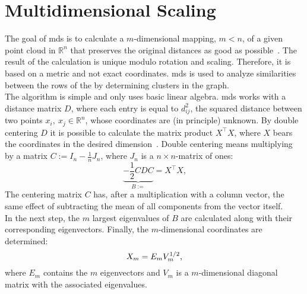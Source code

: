 \section{Multidimensional Scaling}
The goal of \gls{mds} is to calculate a $ m $-dimensional mapping, $ m < n $, of a given point cloud in $ \mathbb{R}^n $ that preserves the original distances as good as possible~\cite{HaTiFr17ESL}. The result of the calculation is unique modulo rotation and scaling. Therefore, it is based on a metric and not exact coordinates. \gls{mds} is used to analyze similarities between the rows of the \srmat{} by determining clusters in the graph.\\
%
The algorithm is simple and only uses basic linear algebra. \gls{mds} works with a distance matrix $ D $, where each entry is equal to $ d_{ij}^2 $, the squared distance between two points $ x_i, \ x_j \in \mathbb{R}^n $, whose coordinates are (in principle) unknown. By double centering $ D $ it is possible to calculate the matrix product $ X^\top X $, where $ X $ bears the coordinates in the desired dimension~\cite{Riess20PA}. Double centering means multiplying by a matrix $ C := I_n - \frac{1}{n}J_n$, where $ J_n $ is a $ n \times n $-matrix of ones:
\begin{equation}
	\underbrace{-\frac{1}{2} CDC}_{B :=} = X^\top X
	\text{,}
\end{equation}
The centering matrix $ C $ has, after a multiplication with a column vector, the same effect of subtracting the mean of all components from the vector itself. \\
In the next step, the $ m $ largest eigenvalues of $ B $ are calculated along with their corresponding eigenvectors. Finally, the $ m $-dimensional coordinates are determined:
\begin{equation}
	X_m = E_m V_m^{1/2}
	\text,
\end{equation}
where $ E_m $ contains the $ m $ eigenvectors and $ V_m $ is a $ m $-dimensional diagonal matrix with the associated eigenvalues.
